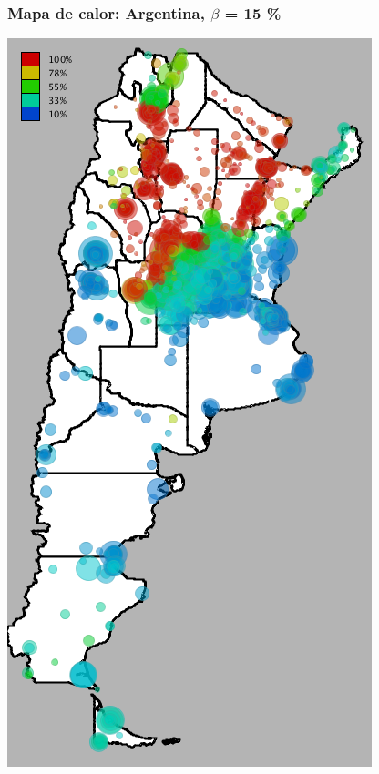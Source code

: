 \documentclass{beamer}
\begin{document}
\begin{frame}
	\frametitle{Mapa de calor: Argentina, $\beta$ = 15 \%}
	\center
	\includegraphics[height=.9\textheight,width = .9\columnwidth, keepaspectratio]
	{slides/201112_hi_res_argentina_usuarios_proporcion_circulos_beta15.png}
\end{frame}
\end{document}
